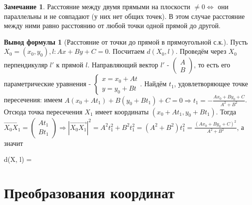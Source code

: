 \documentclass[a4paper, 12pt]{article}
\theoremstyle{definition}
\newtheorem*{formula}{Вывод формулы}
\newtheorem*{remark}{Замечание}
\newenvironment{boxedalign*}
  {\begin{equation*}\begin{lrbox}{\boxedalignbox}$\begin{aligned}}
  {\end{aligned}$\end{lrbox}\fbox{\usebox{\boxedalignbox}}\end{equation*}}
\begin{document}
	\begin{remark}
		Расстояние между двумя прямыми на плоскости $\neq 0 \Leftrightarrow$ они параллельны и не совпадают (у них нет общих точек). В этом случае расстояние между ними равно расстоянию от любой точки одной прямой до другой. 
	\end{remark}
	\begin{formula}[Расстояние от точки до прямой в прямоугольной с.к.]
		Пусть $X_{0} = (x_{0}, y_{0}), l: Ax + By + C = 0$. Посчитаем $d(X_{0}, l)$. Проведём через $X_{0}$ перпендикуляр $l'$ к прямой $l$. Направляющий вектор $l'$ - $\begin{pmatrix} A \\ B \end{pmatrix}$, то есть его параметрические уравнения - $\begin{cases} x = x_{0} + At \\ y = y_{0} + Bt \end{cases}$. Найдём $t_{1}$, удовлетворяющее точке пересечения: имеем $A(x_{0} + At_{1}) + B(y_{0} + Bt_{1}) + C = 0 \Rightarrow t_{1} = -\frac{Ax_{0} + By_{0} + C}{A^2+B^2}$.\\
		Отсюда точка пересечения $X_{1}$ имеет координаты $(x_{0} + At_{1}, y_{0} + Bt_{1})$. Тогда $\overrightarrow{X_{0}X_{1}} = \begin{pmatrix} At_{1} \\ Bt_{1} \end{pmatrix} \Rightarrow |\overrightarrow{X_{0}X_{1}}|^2 = A^2t_{1}^2 + B^2t_{1}^2 = (A^2 + B^2)t_{1}^2 = \frac{(Ax_{0} + By_{0} + C)^2}{A^2 + B^2}$, а значит \begin{boxedalign*} d(X, l) =  \end{boxedalign*}
	\end{formula}
	\section{Преобразования координат}
\end{document}

